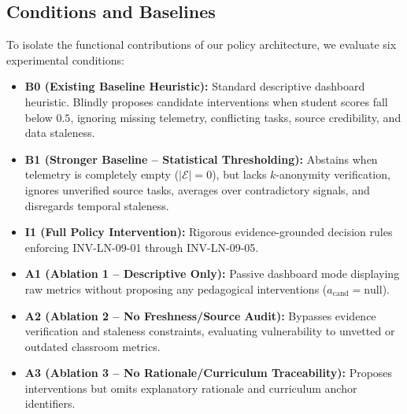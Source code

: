 \documentclass[11pt,a4paper]{article}
\begin{document}
\subsection{Conditions and Baselines}
To isolate the functional contributions of our policy architecture, we evaluate six experimental conditions:
\begin{itemize}
    \item \textbf{B0 (Existing Baseline Heuristic):} Standard descriptive dashboard heuristic. Blindly proposes candidate interventions when student scores fall below $0.5$, ignoring missing telemetry, conflicting tasks, source credibility, and data staleness.
    \item \textbf{B1 (Stronger Baseline -- Statistical Thresholding):} Abstains when telemetry is completely empty ($|\mathcal{E}|=0$), but lacks $k$-anonymity verification, ignores unverified source tasks, averages over contradictory signals, and disregards temporal staleness.
    \item \textbf{I1 (Full Policy Intervention):} Rigorous evidence-grounded decision rules enforcing \textsc{INV-LN-09-01} through \textsc{INV-LN-09-05}.
    \item \textbf{A1 (Ablation 1 -- Descriptive Only):} Passive dashboard mode displaying raw metrics without proposing any pedagogical interventions ($a_{\text{cand}} = \text{null}$).
    \item \textbf{A2 (Ablation 2 -- No Freshness/Source Audit):} Bypasses evidence verification and staleness constraints, evaluating vulnerability to unvetted or outdated classroom metrics.
    \item \textbf{A3 (Ablation 3 -- No Rationale/Curriculum Traceability):} Proposes interventions but omits explanatory rationale and curriculum anchor identifiers.
\end{itemize}
\end{document}
